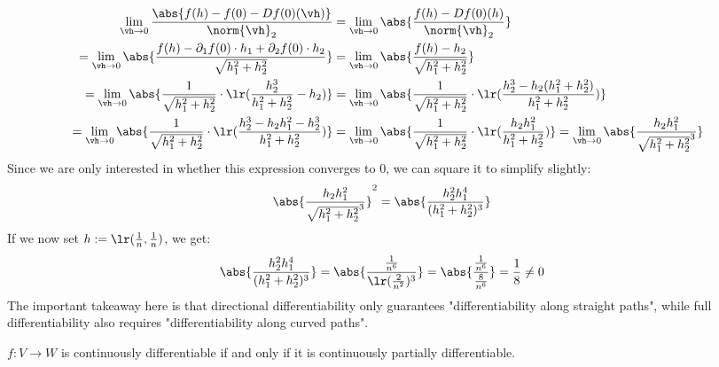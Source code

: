 \begin{align*}
	\lim_{\vh \to 0} \frac{\abs{f(h) - f(0) - Df(0)(\vh)}}{\norm{\vh}_2}
	&=
	\lim_{\vh \to 0} \abs{\frac{f(h) - Df(0)(h)}{\norm{\vh}_2}}\\
	=
	\lim_{\vh \to 0} \abs{\frac{f(h) - \partial_1 f(0) \cdot h_1 + \partial_2 f(0) \cdot h_2}{\sqrt{h_1^2 + h_2^2}}}
	&=
	\lim_{\vh \to 0} \abs{\frac{f(h) - h_2}{\sqrt{h_1^2 + h_2^2}}}\\
	=
	\lim_{\vh \to 0} \abs{\frac{1}{\sqrt{h_1^2 + h_2^2}} \cdot \lr(\frac{h_2^3}{h_1^2 + h_2^2} - h_2)}
	&=
	\lim_{\vh \to 0} \abs{\frac{1}{\sqrt{h_1^2 + h_2^2}} \cdot \lr(\frac{h_2^3 - h_2(h_1^2 + h_2^2)}{h_1^2 + h_2^2})}\\
	=
	\lim_{\vh \to 0} \abs{\frac{1}{\sqrt{h_1^2 + h_2^2}} \cdot \lr(\frac{h_2^3 - h_2h_1^2 - h_2^3}{h_1^2 + h_2^2})}
	&=
	\lim_{\vh \to 0} \abs{\frac{1}{\sqrt{h_1^2 + h_2^2}} \cdot \lr(\frac{h_2h_1^2}{h_1^2 + h_2^2})}
	=
	\lim_{\vh \to 0} \abs{\frac{h_2h_1^2}{\sqrt{h_1^2 + h_2^2}^3}}
\end{align*}
Since we are only interested in whether this expression converges to $0$, we can square it to simplify slightly:
\begin{align*}
	\abs{\frac{h_2h_1^2}{\sqrt{h_1^2 + h_2^2}^3}}^2
	&=
	\abs{\frac{h_2^2h_1^4}{(h_1^2 + h_2^2)^3}}
\end{align*}
If we now set $h := \lr(\frac{1}{n}, \frac{1}{n})$, we get:
\begin{align*}
	\abs{\frac{h_2^2h_1^4}{(h_1^2 + h_2^2)^3}}
	&=
	\abs{\frac{\frac{1}{n^6}}{\lr(\frac{2}{n^2})^3}}
	=
	\abs{\frac{\frac{1}{n^6}}{\frac{8}{n^6}}}
	=
	\frac{1}{8}
	\neq 
	0
\end{align*}
The important takeaway here is that directional differentiability only guarantees "differentiability along straight paths", while full differentiability also requires "differentiability along curved paths".
\begin{importanttheorem}{}{}
	$f : V \to W$ is continuously differentiable if and only if it is continuously partially differentiable.
\end{importanttheorem}
